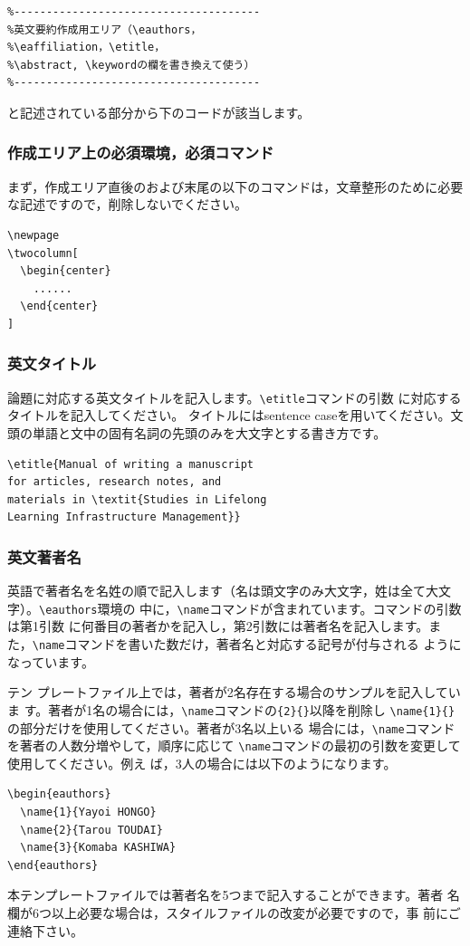 \documentclass[b5paper,10pt,twocolumn,tombow]{jarticle}
\begin{document}
\small
\begin{verbatim}
%--------------------------------------
%英文要約作成用エリア（\eauthors，
%\eaffiliation，\etitle，
%\abstract, \keywordの欄を書き換えて使う）
%--------------------------------------
\end{verbatim}
\normalsize
と記述されている部分から下のコードが該当します。

\subsubsection{作成エリア上の必須環境，必須コマンド}
まず，作成エリア直後のおよび末尾の以下のコマンドは，文章整形のために必要
な記述ですので，削除しないでください。
\begin{verbatim}
\newpage
\twocolumn[
  \begin{center}
    ......
  \end{center}
]
\end{verbatim}


\subsubsection{英文タイトル}
論題に対応する英文タイトルを記入します。\verb|\etitle|コマンドの引数
に対応するタイトルを記入してください。
タイトルにはsentence caseを用いてください。文頭の単語と文中の固有名詞の先頭のみを大文字とする書き方です。

\begin{verbatim}
\etitle{Manual of writing a manuscript
for articles, research notes, and
materials in \textit{Studies in Lifelong
Learning Infrastructure Management}}
\end{verbatim}

\subsubsection{英文著者名}
英語で著者名を名姓の順で記入します（名は頭文字のみ大文字，姓は全て大文字）。\verb|\eauthors|環境の
中に，\verb|\name|コマンドが含まれています。コマンドの引数は第1引数
に何番目の著者かを記入し，第2引数には著者名を記入します。ま
た，\verb|\name|コマンドを書いた数だけ，著者名と対応する記号が付与される
ようになっています。


テン
プレートファイル上では，著者が2名存在する場合のサンプルを記入していま
す。著者が1名の場合には，\verb|\name|コマンドの\verb|{2}{}|以降を削除し
\verb|\name{1}{}|の部分だけを使用してください。著者が3名以上いる
場合には，\verb|\name|コマンドを著者の人数分増やして，順序に応じて
\verb|\name|コマンドの最初の引数を変更して使用してください。例え
ば，3人の場合には以下のようになります。
\begin{verbatim}
\begin{eauthors}
  \name{1}{Yayoi HONGO}
  \name{2}{Tarou TOUDAI}
  \name{3}{Komaba KASHIWA}
\end{eauthors}
\end{verbatim}
本テンプレートファイルでは著者名を5つまで記入することができます。著者
名欄が6つ以上必要な場合は，スタイルファイルの改変が必要ですので，事
前にご連絡下さい。
\end{document}
